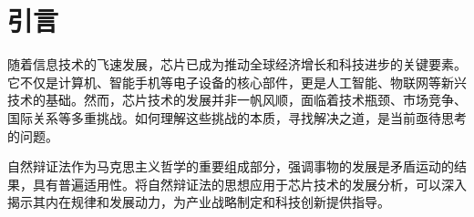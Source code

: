\documentclass[12pt,hyperref,a4paper,UTF8]{ctexart}
\begin{document}

\cover

\newpage
\thispagestyle{empty}
\mbox{}

\newpage
\begin{abstract}


芯片技术作为现代信息社会的核心支撑，其发展深刻影响着全球经济和科技进步。在芯片技术的发展历史中，对立统一规律、量变质变规律、否定之否定规律等自然辩证法原理都得到了充分体现。本文从自然辩证法的角度出发，分析芯片技术的发展历程和现状，探讨其内在矛盾与发展规律，以期为理解和推动芯片技术的未来发展提供理论参考。

\vspace{1em}

\noindent
\textbf{关键词：} 自然辩证法；芯片技术；矛盾；发展规律；科技创新
\end{abstract}

\thispagestyle{empty} %


\newpage
{}
\setcounter{page}{1}


\section{引言}

随着信息技术的飞速发展，芯片已成为推动全球经济增长和科技进步的关键要素。它不仅是计算机、智能手机等电子设备的核心部件，更是人工智能、物联网等新兴技术的基础。然而，芯片技术的发展并非一帆风顺，面临着技术瓶颈、市场竞争、国际关系等多重挑战。如何理解这些挑战的本质，寻找解决之道，是当前亟待思考的问题。

自然辩证法作为马克思主义哲学的重要组成部分，强调事物的发展是矛盾运动的结果，具有普遍适用性。将自然辩证法的思想应用于芯片技术的发展分析，可以深入揭示其内在规律和发展动力，为产业战略制定和科技创新提供指导。
\end{document}
